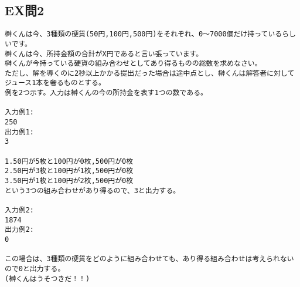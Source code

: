 \documentclass[a4j,titlepage,dvipdfmx]{jsarticle}   %
\begin{document}
\subsection{EX問2}
\begin{verbatim}
榊くんは今、3種類の硬貨(50円,100円,500円)をそれぞれ、0～7000個だけ持っているらしいです。
榊くんは今、所持金額の合計がX円であると言い張っています。
榊くんが今持っている硬貨の組み合わせとしてあり得るものの総数を求めなさい。
ただし、解を導くのに2秒以上かかる提出だった場合は途中点とし、榊くんは解答者に対してジュース1本を奢るものとする。
例を2つ示す。入力は榊くんの今の所持金を表す1つの数である。

入力例1:
250
出力例1:
3

1.50円が5枚と100円が0枚,500円が0枚
2.50円が3枚と100円が1枚,500円が0枚
3.50円が1枚と100円が2枚,500円が0枚
という3つの組み合わせがあり得るので、3と出力する。

入力例2:
1874
出力例2:
0

この場合は、3種類の硬貨をどのように組み合わせても、あり得る組み合わせは考えられないので0と出力する。
(榊くんはうそつきだ！！)
\end{verbatim}
\end{document}
